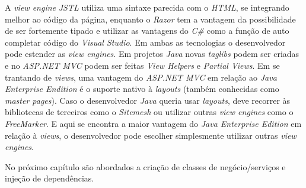 A \textit{view engine} \textit{JSTL} utiliza uma sintaxe parecida com o \textit{HTML}, se integrando melhor ao código da página, enquanto o \textit{Razor} tem a vantagem da possibilidade de ser fortemente tipado e utilizar as vantagens do \textit{C\#} como a função de auto completar código do \textit{Visual Studio}. Em ambas as tecnologias o desenvolvedor pode estender as \textit{view engines}. Em projetos \textit{Java} novas \textit{taglibs} podem ser criadas e no \textit{ASP.NET MVC} podem ser feitas \textit{View Helpers} e \textit{Partial Views}. Em se trantando de \textit{views}, uma vantagem do \textit{ASP.NET MVC} em relação ao \textit{Java Enterprise Endition} é o suporte nativo à \textit{layouts} (também conhecidas como \textit{master pages}). Caso o desenvolvedor \textit{Java} queria usar \textit{layouts}, deve recorrer às bibliotecas de terceiros como o \textit{Sitemesh} ou utilizar outras \textit{view engines} como o \textit{FreeMarker}. E aqui se encontra a maior vantagem do \textit{Java Enterprise Edition} em relação à \textit{views}, o desenvolvedor pode escolher simplesmente utilizar outras \textit{view engines}.

No próximo capítulo são abordados a criação de classes de negócio/serviços e injeção de dependências.